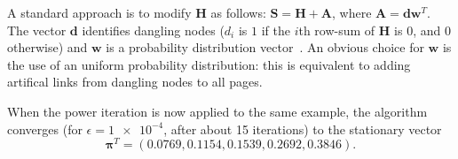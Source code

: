 \documentclass[a4paper,english,11pt]{scrartcl}
\renewcommand{\vec}[1]{\mathbf{#1}}
\begin{document}
A standard approach is to modify $\vec{H}$ as follows: $\vec{S}=\vec{H}+\vec{A}$, where $\vec{A}=\vec{d}\vec{w}^T$. The vector $\vec{d}$ identifies dangling nodes ($d_i$ is $1$ if the $i$th row-sum of $\vec{H}$ is 0, and 0 otherwise) and $\vec{w}$ is a probability distribution vector~\cite{math}. 
An obvious choice for $\vec{w}$ is the use of an uniform probability distribution: this is equivalent to adding artifical links from dangling nodes to all pages. 

When the power iteration is now applied to the same example, the algorithm converges (for $\epsilon=\num{1e-4}$, after about 15 iterations) to the stationary vector \[\boldsymbol{\pi}^T=(0.0769, 0.1154, 0.1539, 0.2692, 0.3846).\]


% 
% 
\end{document}
